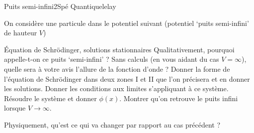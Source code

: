 \begin{exercise}{Puits semi-infini}{2}{Spé}
{Quantique}{lelay}

On considère une particule dans le potentiel suivant (potentiel `puits semi-infini' de hauteur $V$)

\begin{center}
\end{center}

\begin{questions}
    \questioncours Équation de Schrödinger, solutions stationnaires
    \question Qualitativement, pourquoi appelle-t-on ce puits `semi-infini' ?
    \question Sans calculs (en vous aidant du cas $V = \infty$), quelle sera à votre avis l'allure de la fonction d'onde ?
    \question Donner la forme de l'équation de Schrödinger dans deux zones I et II que l'on précisera et en donner les solutions. 
    \question Donner les conditions aux limites s'appliquant à ce système.
    \question Résoudre le système et donner $\phi(x)$.
    \question Montrer qu'on retrouve le puits infini lorsque $V \rightarrow \infty$.
\begin{center}
\end{center}
    \question Physiquement, qu'est ce qui va changer par rapport au cas précédent ?

\end{questions}

\end{exercise}